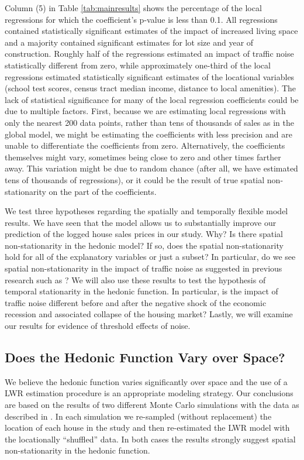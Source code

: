 \documentclass{article}\usepackage[]{graphicx}\usepackage[]{color}
\begin{document}
Column (5) in Table \ref{tab:mainresults} shows the percentage of the local regressions for which the coefficient's p-value is less than 0.1. All regressions contained statistically significant estimates of the impact of increased living space and a majority contained significant estimates for lot size and year of construction. Roughly half of the regressions estimated an impact of traffic noise statistically different from zero, while approximately one-third of the local regressions estimated statistically significant estimates of the locational variables (school test scores, census tract median income, distance to local amenities). The lack of statistical significance for many of the local regression coefficients could be due to multiple factors. First, because we are estimating local regressions with only the nearest 200 data points, rather than tens of thousands of sales as in the global model, we might be estimating the coefficients with less precision and are unable to differentiate the coefficients from zero. Alternatively, the coefficients themselves might vary, sometimes being close to zero and other times farther away. This variation might be due to random chance (after all, we have estimated tens of thousands of regressions), or it could be the result of true spatial non-stationarity on the part of the coefficients. 

We test three hypotheses regarding the spatially and temporally flexible model results. We have seen that the model allows us to substantially improve our prediction of the logged house sales prices in our study. Why? Is there spatial non-stationarity in the hedonic model? If so, does the spatial non-stationarity hold for all of the explanatory variables or just a subset? In particular, do we see spatial non-stationarity in the impact of traffic noise as suggested in previous research such as \citet{MarmolejoDuarteCarlos;GonzalezTamez2009}? We will also use these results to test the hypothesis of temporal stationarity in the hedonic function. In particular, is the impact of traffic noise different before and after the negative shock of the economic recession and associated collapse of the housing market? Lastly, we will examine our results for evidence of threshold effects of noise. 

\subsection{Does the Hedonic Function Vary over Space?}
We believe the hedonic function varies significantly over space and the use of a LWR estimation procedure is an appropriate modeling strategy. Our conclusions are based on the results of two different Monte Carlo simulations with the data as described in \citet{Fotheringham2002}. In each simulation we re-sampled (without replacement) the location of each house in the study and then re-estimated the LWR model with the locationally ``shuffled'' data. In both cases the results strongly suggest spatial non-stationarity in the hedonic function. 
\end{document}
